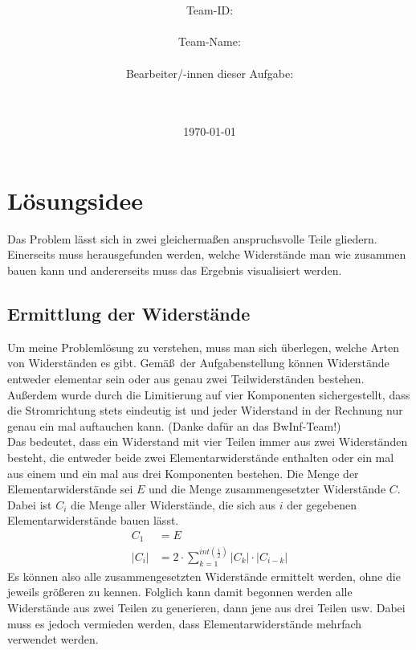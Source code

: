 \documentclass[a4paper,10pt,ngerman]{scrartcl}
\title{\textbf{\Huge\Aufgabe}}
\author{\LARGE Team-ID: \LARGE \TeamID \\\\
	    \LARGE Team-Name: \LARGE \TeamName \\\\
	    \LARGE Bearbeiter/-innen dieser Aufgabe: \\ 
	    \LARGE \Namen\\\\}
\date{\LARGE\today}
\begin{document}
\maketitle
\tableofcontents

\vspace{0.5cm}

\section{Lösungsidee}
Das Problem l\"asst sich in zwei gleicherma\ss en anspruchsvolle Teile gliedern.
Einerseits muss herausgefunden werden, welche Widerst\"ande man wie zusammen bauen
kann und andererseits muss das Ergebnis visualisiert werden.
\subsection{Ermittlung der Widerst\"ande}
Um meine Probleml\"osung zu verstehen, muss man sich \"uberlegen, welche Arten von
Widerst\"anden es gibt. Gem\"a\ss\ der Aufgabenstellung k\"onnen Widerst\"ande entweder
elementar sein oder aus genau zwei Teilwiderst\"anden bestehen. Au\ss erdem wurde
durch die Limitierung auf vier Komponenten sichergestellt, dass die Stromrichtung stets 
eindeutig ist und jeder Widerstand in der Rechnung nur genau ein mal auftauchen kann.
(Danke daf\"ur an das BwInf-Team!)\\
\indent Das bedeutet, dass ein Widerstand mit vier Teilen immer aus zwei Widerst\"anden
besteht, die entweder beide zwei Elementarwiderst\"ande enthalten oder ein mal aus
einem und ein mal aus drei Komponenten bestehen. Die Menge der Elementarwiderst\"ande
sei $E$ und die Menge zusammengesetzter Widerst\"ande $C$. Dabei ist $C_i$ die Menge
aller Widerst\"ande, die sich aus $i$ der gegebenen Elementarwiderst\"ande bauen l\"asst.
\begin{align}
  C_1 &= E\\
  |C_i| &= 2 \cdot \sum_{k=1}^{int(\frac{i}{2})} |C_{k}| \cdot |C_{i-k}| 
\end{align}
Es k\"onnen also alle zusammengesetzten Widerst\"ande ermittelt 
werden, ohne die jeweils
gr\"o\ss eren zu kennen. Folglich kann damit begonnen werden alle 
Widerst\"ande aus zwei
Teilen zu generieren, dann jene aus drei Teilen usw. Dabei muss 
es jedoch vermieden werden,
dass Elementarwiderst\"ande mehrfach verwendet werden.
\end{document}
